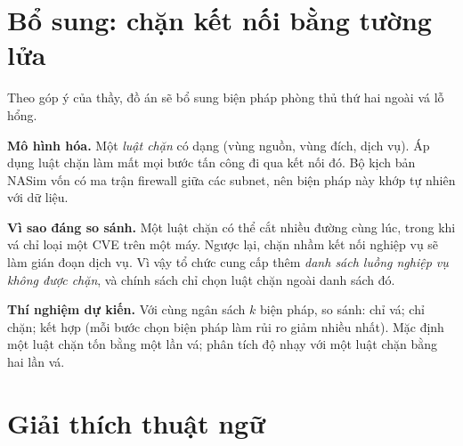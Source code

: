 \documentclass[11pt,a4paper]{article}
\begin{document}
\section{Bổ sung: chặn kết nối bằng tường lửa}

Theo góp ý của thầy, đồ án sẽ bổ sung biện pháp phòng thủ thứ hai ngoài vá lỗ hổng.

\textbf{Mô hình hóa.} Một \emph{luật chặn} có dạng (vùng nguồn, vùng đích, dịch vụ). Áp dụng luật chặn làm mất mọi bước tấn công đi qua kết nối đó. Bộ kịch bản NASim vốn có ma trận firewall giữa các subnet, nên biện pháp này khớp tự nhiên với dữ liệu.

\textbf{Vì sao đáng so sánh.} Một luật chặn có thể cắt nhiều đường cùng lúc, trong khi vá chỉ loại một CVE trên một máy. Ngược lại, chặn nhầm kết nối nghiệp vụ sẽ làm gián đoạn dịch vụ. Vì vậy tổ chức cung cấp thêm \emph{danh sách luồng nghiệp vụ không được chặn}, và chính sách chỉ chọn luật chặn ngoài danh sách đó.

\textbf{Thí nghiệm dự kiến.} Với cùng ngân sách $k$ biện pháp, so sánh: chỉ vá; chỉ chặn; kết hợp (mỗi bước chọn biện pháp làm rủi ro giảm nhiều nhất). Mặc định một luật chặn tốn bằng một lần vá; phân tích độ nhạy với một luật chặn bằng hai lần vá.

\section{Giải thích thuật ngữ}
\end{document}
